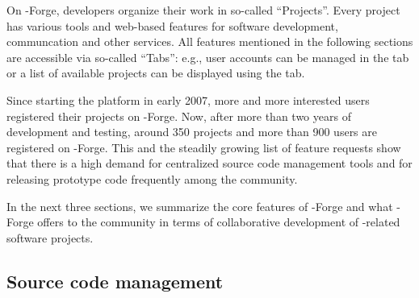 




On \R{}-Forge, developers organize their work
in so-called ``Projects''. Every project has various tools and
web-based features for software development, communcation and other
services. All features mentioned in the
following sections are accessible via so-called
``Tabs'': e.g., user accounts can be managed in the  tab or
a list of available projects can be displayed using the
 tab.

Since starting the platform in early 2007, more
and more interested users registered their projects on
\R{}-Forge. Now, after more than two years of development and testing, around
350 projects and more than 900
users are registered on \R{}-Forge. This and the steadily growing list of
feature requests show that there is a high demand for centralized source code
management tools and for releasing prototype code frequently among the
\R{} community. %

In the next three sections, we summarize the core features of
\R{}-Forge and what \R{}-Forge offers to the \R{} community in terms
of  collaborative development of \R{}-related software projects.

\subsection{Source code management}


